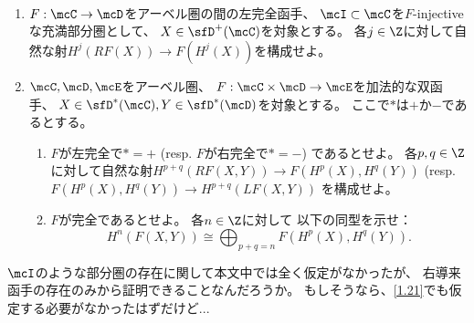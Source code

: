 \documentclass[uplatex,dvipdfmx]{jsarticle}
\begin{document}
\maketitle\HeaderCommentA
\section{}
\fi


\begin{prob}\label{1.24}
  \
  \begin{enumerate}
    \item \label{1.24.1}
    \(F:\mcC\to \mcD\)をアーベル圏の間の左完全函手、
    \(\mcI\subset \mcC\)を\(F\)-injectiveな充満部分圏として、
    \(X\in \sfD^+(\mcC)\)を対象とする。
    各\(j\in \Z\)に対して自然な射\(H^j(RF(X)) \to F(H^j(X))\)を構成せよ。
    \item \label{1.24.2}
    \(\mcC,\mcD,\mcE\)をアーベル圏、
    \(F:\mcC\times \mcD\to \mcE\)を加法的な双函手、
    \(X\in \sfD^*(\mcC), Y\in \sfD^*(\mcD)\)を対象とする。
    ここで\(*\)は\(+\)か\(-\)であるとする。
    \begin{enumerate}
      \item \label{1.24.2.1}
      \(F\)が左完全で\(*=+\)
      (resp. \(F\)が右完全で\(*=-\))
      であるとせよ。
      各\(p,q\in \Z\)に対して自然な射\(H^{p+q}(RF(X,Y)) \to F(H^p(X),H^q(Y))\)
      (resp. \(F(H^p(X),H^q(Y)) \to H^{p+q}(LF(X,Y))\)
      を構成せよ。
      \item \label{1.24.2.2}
      \(F\)が完全であるとせよ。
      各\(n\in \Z\)に対して
      以下の同型を示せ：
      \[
      H^n(F(X,Y)) \cong \bigoplus_{p+q=n}F(H^p(X),H^q(Y)).
      \]
    \end{enumerate}
  \end{enumerate}
\end{prob}

\begin{rem*}
  \(\mcI\)のような部分圏の存在に関して本文中では全く仮定がなかったが、
  右導来函手の存在のみから証明できることなんだろうか。
  もしそうなら、\autoref{1.21}でも仮定する必要がなかったはずだけど...
\end{rem*}
\end{document}
